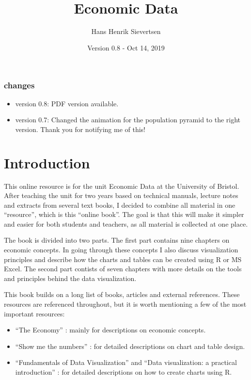 \documentclass[]{book}
\title{Economic Data}
\author{Hans Henrik Sievertsen}
\date{Version 0.8 - Oct 14, 2019}
\providecommand{\tightlist}{%
  \setlength{\itemsep}{0pt}\setlength{\parskip}{0pt}}
\begin{document}
\maketitle

{
\setcounter{tocdepth}{1}
\tableofcontents
}
\hypertarget{changes}{%
\subsection*{changes}\label{changes}}

\begin{itemize}
\item
  version 0.8: PDF version available. 
\item
  version 0.7: Changed the animation for the population pyramid to the right version. Thank you for notifying me of this! 
\end{itemize}

\hypertarget{introduction}{%
\chapter*{Introduction}\label{introduction}}

This online resource is for the unit Economic Data at the University of Bristol. After teaching the unit for two years based on technical manuals, lecture notes and extracts from several text books, I decided to combine all material in one ``resource'', which is this ``online book''. The goal is that this will make it simpler and easier for both students and teachers, as all material is collected at one place.

The book is divided into two parts. The first part contains nine chapters on economic concepts. In going through these concepts I also discuss visualization principles and describe how the charts and tables can be created using R or MS Excel. The second part contists of seven chapters with more details on the tools and principles behind the data visualization.

This book builds on a long list of books, articles and external references. These resources are referenced throughout, but it is worth mentioning a few of the most important resources:

\begin{itemize}
\tightlist
\item
  ``The Economy'' \citep{core}: mainly for descriptions on economic concepts.
\item
  ``Show me the numbers'' \citep{few2012show}: for detailed descriptions on chart and table design.
\item
  ``Fundamentals of Data Visualization'' \citep{wilke2019fundamentals} and ``Data visualization: a practical introduction'' \citep{healy2018data}: for detailed descriptions on how to create charts using R.
\end{itemize}
\end{document}
